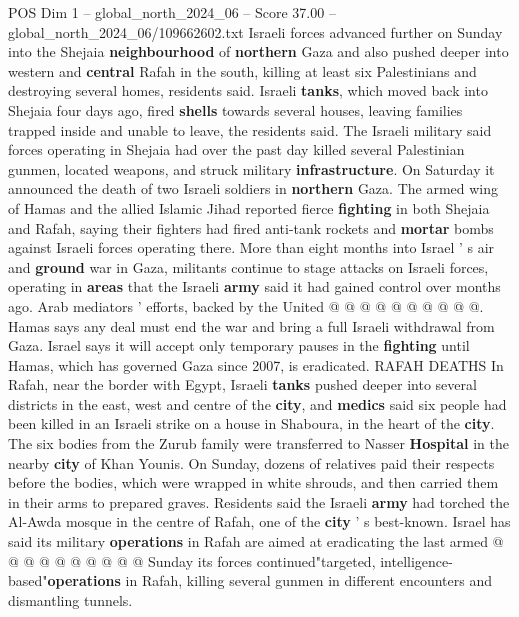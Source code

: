 \begin{textsample}{POS Dim 1 – global\_north\_2024\_06 – Score 37.00 – global\_north\_2024\_06/109662602.txt}  \label{ex:f1_pos_240}
Israeli forces advanced further on Sunday into the Shejaia \textbf{neighbourhood} of \textbf{northern} Gaza and also pushed deeper into western and \textbf{central} Rafah in the south, killing at least six Palestinians and destroying several homes, residents said.
Israeli \textbf{tanks}, which moved back into Shejaia four days ago, fired \textbf{shells} towards several houses, leaving families trapped inside and unable to leave, the residents said.
The Israeli military said forces operating in Shejaia had over the past day killed several Palestinian gunmen, located weapons, and struck military \textbf{infrastructure}.
On Saturday it announced the death of two Israeli soldiers in \textbf{northern} Gaza.
The armed wing of Hamas and the allied Islamic Jihad reported fierce \textbf{fighting} in both Shejaia and Rafah, saying their fighters had fired anti-tank rockets and \textbf{mortar} bombs against Israeli forces operating there.
More than eight months into Israel ' s air and \textbf{ground} war in Gaza, militants continue to stage attacks on Israeli forces, operating in \textbf{areas} that the Israeli \textbf{army} said it had gained control over months ago.
Arab mediators ' efforts, backed by the United @ @ @ @ @ @ @ @ @ @.
Hamas says any deal must end the war and bring a full Israeli withdrawal from Gaza.
Israel says it will accept only temporary pauses in the \textbf{fighting} until Hamas, which has governed Gaza since 2007, is eradicated.
RAFAH DEATHS In Rafah, near the border with Egypt, Israeli \textbf{tanks} pushed deeper into several districts in the east, west and centre of the \textbf{city}, and \textbf{medics} said six people had been killed in an Israeli strike on a house in Shaboura, in the heart of the \textbf{city}.
The six bodies from the Zurub family were transferred to Nasser \textbf{Hospital} in the nearby \textbf{city} of Khan Younis.
On Sunday, dozens of relatives paid their respects before the bodies, which were wrapped in white shrouds, and then carried them in their arms to prepared graves.
Residents said the Israeli \textbf{army} had torched the Al-Awda mosque in the centre of Rafah, one of the \textbf{city} ' s best-known.
Israel has said its military \textbf{operations} in Rafah are aimed at eradicating the last armed @ @ @ @ @ @ @ @ @ @ Sunday its forces continued"targeted, intelligence-based"\textbf{operations} in Rafah, killing several gunmen in different encounters and dismantling tunnels.

\end{textsample}
